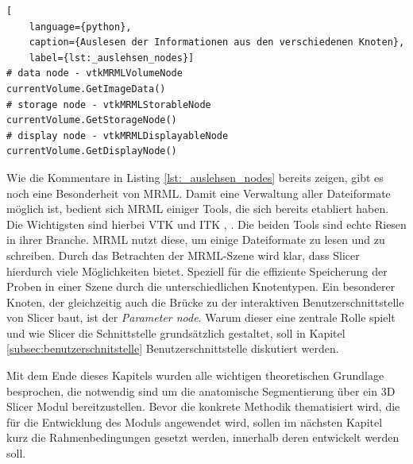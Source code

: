\begin{lstlisting}[
	language={python},
	caption={Auslesen der Informationen aus den verschiedenen Knoten},
	label={lst:_auslehsen_nodes}]
# data node - vtkMRMLVolumeNode
currentVolume.GetImageData()
# storage node - vtkMRMLStorableNode
currentVolume.GetStorageNode()
# display node - vtkMRMLDisplayableNode
currentVolume.GetDisplayNode()
\end{lstlisting}

Wie die Kommentare in Listing \ref{lst:_auslehsen_nodes} bereits zeigen, gibt es
noch eine Besonderheit von \ac{MRML}. Damit eine Verwaltung aller Dateiformate
möglich ist, bedient sich \ac{MRML} einiger Tools, die sich bereits etabliert haben.
Die Wichtigsten sind hierbei \ac{VTK} und \ac{ITK} \citep[vgl.][K.~1.1]{vtk2006},
\citep[vgl.][K.~1.1]{itkguide2015}. Die beiden Tools sind echte Riesen in ihrer
Branche. \ac{MRML} nutzt diese, um einige Dateiformate zu lesen und zu schreiben.
Durch das Betrachten der \ac{MRML}-Szene wird klar, dass Slicer hierdurch viele
Möglichkeiten bietet. Speziell für die effiziente Speicherung der Proben in einer
Szene durch die unterschiedlichen Knotentypen. Ein besonderer Knoten, der gleichzeitig
auch die Brücke zu der interaktiven Benutzerschnittstelle von Slicer baut, ist
der \textit{Parameter node}. Warum dieser eine zentrale Rolle spielt und wie
Slicer die Schnittstelle grundsätzlich gestaltet, soll in Kapitel \ref{subsec:benutzerschnitstelle}
Benutzerschnittstelle diskutiert werden.

Mit dem Ende dieses Kapitels wurden alle wichtigen theoretischen Grundlage besprochen,
die notwendig sind um die anatomische Segmentierung über ein 3D Slicer Modul
bereitzustellen. Bevor die konkrete Methodik thematisiert wird, die für die
Entwicklung des Moduls angewendet wird, sollen im nächsten Kapitel kurz die Rahmenbedingungen
gesetzt werden, innerhalb deren entwickelt werden soll.
